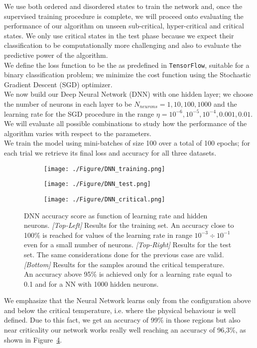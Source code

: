 \documentclass[a4paper,11pt]{article}
\begin{document}
We use both ordered and disordered states to train the network and, once the supervised training procedure is complete, we will proceed onto evaluating the performance of our algorithm on unseen sub-critical, hyper-critical and critical states. We only use critical states in the test phase because we expect their classification to be computationally more challenging and also to evaluate the predictive power of the algorithm.
\\
We define the loss function to be the  as predefined in \texttt{TensorFlow}, suitable for a binary classification problem; we minimize the cost function using the Stochastic Gradient Descent (SGD) optimizer.
\\
We now build our Deep Neural Network (DNN) with one hidden layer; we choose the number of neurons in each layer to be $N_{neurons} = 1,10,100,1000$ and the learning rate for the  SGD procedure in the range $\eta = 10^{-6}, 10^{-5}, 10^{-4}, 0.001, 0.01$. We will evaluate all possible combinations to study how the performance of the algorithm varies with respect to the parameters.
\\
We train the model using mini-batches of size 100 over a total of 100 epochs; for each trial we retrieve its final loss and accuracy for all three datasets.

\begin{figure}[htp]
  \centering
  \begin{subfigure}{.49\textwidth}
    \centering
    \texttt{[image: ./Figure/DNN\_training.png]}
    \label{fig:DNN_train}
  \end{subfigure}
  \begin{subfigure}{.49\textwidth}
    \texttt{[image: ./Figure/DNN\_test.png]}
    \label{fig:DNN_test}
  \end{subfigure}
  \begin{subfigure}{.49\textwidth}
    \texttt{[image: ./Figure/DNN\_critical.png]}
    \label{fig:DNN_critical}
  \end{subfigure}
  \caption{DNN accuracy score as function of learning rate and hidden neurons. \emph{[Top-Left]} Results for the training set. An accuracy close to 100\% is reached for values of the learning rate in range $10^{-3} \div 10^{-1}$ even for a small number of neurons. \emph{[Top-Right]} Results for the test set. The same considerations done for the previous case are valid. \emph{[Bottom]} Results for the samples around the critical temperature. An accuracy above 95\% is achieved only for a learning rate equal to 0.1 and for a NN with 1000 hidden neurons.}
  \label{fig:DNN_all}
\end{figure}
We emphasize that the Neural Network learns only from the configuration above and below the critical temperature, i.e. where the physical behaviour is well defined. Due to this fact, we get an accuracy of 99\% in those regions but also near criticality our network works really well reaching an accuracy of 96,3\%, as shown in Figure~\ref{fig:DNN_all}.
\end{document}
